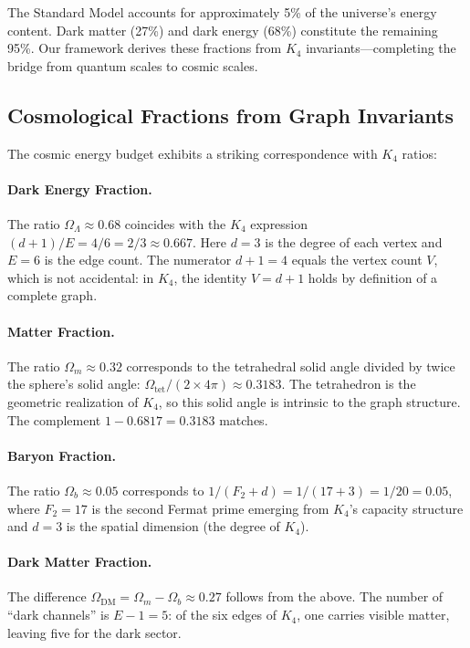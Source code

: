 \documentclass[11pt,a4paper]{book}
\begin{document}
The Standard Model accounts for approximately 5\% of the universe's energy content. 
Dark matter (27\%) and dark energy (68\%) constitute the remaining 95\%. 
Our framework derives these fractions from $K_4$ invariants---completing the bridge
from quantum scales to cosmic scales.

\subsection{Cosmological Fractions from Graph Invariants}

The cosmic energy budget exhibits a striking correspondence with $K_4$ ratios:

\paragraph{Dark Energy Fraction.}
The ratio $\Omega_\Lambda \approx 0.68$ coincides with the $K_4$ expression $(d+1)/E = 4/6 = 2/3 \approx 0.667$.
Here $d = 3$ is the degree of each vertex and $E = 6$ is the edge count.
The numerator $d + 1 = 4$ equals the vertex count $V$, which is not accidental:
in $K_4$, the identity $V = d + 1$ holds by definition of a complete graph.

\paragraph{Matter Fraction.}
The ratio $\Omega_m \approx 0.32$ corresponds to the tetrahedral solid angle divided by twice 
the sphere's solid angle: $\Omega_{\text{tet}}/(2 \times 4\pi) \approx 0.3183$.
The tetrahedron is the geometric realization of $K_4$, so this solid angle is 
intrinsic to the graph structure. The complement $1 - 0.6817 = 0.3183$ matches.

\paragraph{Baryon Fraction.}
The ratio $\Omega_b \approx 0.05$ corresponds to $1/(F_2 + d) = 1/(17 + 3) = 1/20 = 0.05$,
where $F_2 = 17$ is the second Fermat prime emerging from $K_4$'s capacity structure
and $d = 3$ is the spatial dimension (the degree of $K_4$).

\paragraph{Dark Matter Fraction.}
The difference $\Omega_{\text{DM}} = \Omega_m - \Omega_b \approx 0.27$ follows from the above.
The number of ``dark channels'' is $E - 1 = 5$: of the six edges of $K_4$, one carries
visible matter, leaving five for the dark sector.
\end{document}
